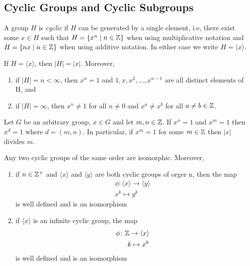 \documentclass[../main]{subfiles}
\begin{document}
 
 \subsection{Cyclic Groups and Cyclic Subgroups}
 
 
 \begin{dfn}
  A group $H$ is \textit{cyclic} if $H$ can be generated by a single element, i.e, there exist some $x\in H$ such that $H= \{x^n\mid n\in \mathbb{Z}\}$ when using multiplicative notation and $H= \{nx \mid n\in \mathbb{Z}\}$ when using additive notation. In either case we write $H = \langle x \rangle$. 
 \end{dfn}
 
 
 \begin{prop}
  If $H=\langle x\rangle$, then $|H|=|x|$. Moreover,
  \begin{enumerate}
   \item if $|H| = n < \infty $, then $x^n = 1$ and $1,x,x^2,\ldots,x^{n-1}$ are all distinct elements of H, and 
   \item if $|H|= \infty$, then $x^n \neq 1$ for all $n \neq 0$ and $x^a \neq x^b$ for all $a\neq b \in \mathbb{Z}$.
  \end{enumerate}
 \end{prop}
 
 
 \begin{prop}
  Let $G$ be an arbitrary group, $x\in G$ and let $m,n \in \mathbb{Z}$. If $x^n = 1$ and $x^m = 1$ then $x^d = 1$ where $d=(m,n)$. In particular, if $x^m=1$ for some $m\in \mathbb{Z}$ then $|x|$ divides $m$.
 \end{prop}
 
 
 \begin{thm}
  Any two cyclic groups of the same order are isomorphic. Moreover, 
  \begin{enumerate}
   \item if $n\in \mathbb{Z}^+$ and $\langle x \rangle$ and $\langle y \rangle$ are both cyclic groups of orger n, then the map
   \begin{align*}
    \phi \colon \langle x \rangle \to \langle y \rangle \\
    x^k \mapsto y^k
   \end{align*}
   is well defined and is an isomorphism
   \item if $\langle x \rangle$ is an infinite cyclic group, the map 
   \begin{align*}
    \phi \colon \mathbb{Z} \to \langle x \rangle \\
    k \mapsto x^k
   \end{align*}
   is well defined and is an isomorphism
  \end{enumerate}
 \end{thm}
\end{document}
